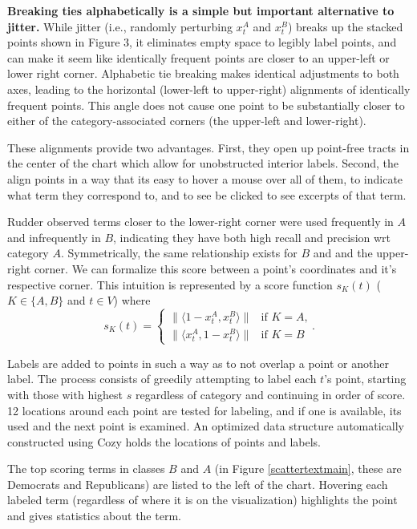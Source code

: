 \documentclass[11pt,a4paper]{article}
\begin{document}
\textbf{Breaking ties alphabetically is a simple but important alternative to jitter.} While jitter (i.e., randomly perturbing $x_{t}^{A}$ and $x_{t}^{B}$) breaks up the stacked points shown in Figure 3, it eliminates empty space to legibly label points, and can make it seem like identically frequent points are closer to an upper-left or lower right corner.  Alphabetic tie breaking makes identical adjustments to both axes, leading to the horizontal (lower-left to upper-right) alignments of identically frequent points.  This angle does not cause one point to be substantially closer to either of the category-associated corners (the upper-left and lower-right). 

These alignments provide two advantages. First, they open up point-free tracts in the center of the chart which allow for unobstructed interior labels. Second, the align points in a way that its easy to hover a mouse over all of them, to indicate what term they correspond to, and to see be clicked to see excerpts of that term.

Rudder  observed terms closer to the lower-right corner were used frequently in $A$ and infrequently in $B$, indicating they have both high recall and precision wrt category $A$.  Symmetrically, the same relationship exists for $B$ and and the upper-right corner.  We can formalize this score between a point's coordinates and it's respective corner.  This intuition is represented by a score function $s_K(t)$ ($K\in\{A,B\}$ and $t\in V$) where
\vspace{-.3cm}
\begin{equation}
s_K(t)= 
\begin{cases} \|\langle 1-x_{t}^{A}, x_{t}^{B}\rangle\| & \text{if $K=A$,}
\\
\|\langle x_{t}^{A}, 1-x_{t}^{B}\rangle\| &\text{if $K=B$}
\end{cases}.
  \label{eqn:cornerscore}
\end{equation}

Labels are added to points in such a way as to not overlap a point or another label.  The process consists of greedily attempting to label each $t$'s point, starting with those with highest $s$ regardless of category and continuing in order of score.  12 locations around each point are tested for labeling, and if one is available, its used and the next point is examined.  An optimized data structure automatically constructed using Cozy \cite{cozy} holds the locations of points and labels. 

The top scoring terms in classes $B$ and $A$ (in Figure \ref{scattertextmain}, these are Democrats and Republicans) are listed to the left of the chart.  Hovering each labeled term (regardless of where it is on the visualization) highlights the point and gives statistics about the term.  
\end{document}
